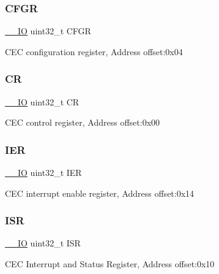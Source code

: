 \subsubsection{\texorpdfstring{C\+F\+GR}{CFGR}}
{\footnotesize\ttfamily \hyperlink{core__sc300_8h_aec43007d9998a0a0e01faede4133d6be}{\+\_\+\+\_\+\+IO} uint32\+\_\+t C\+F\+GR}

C\+EC configuration register, Address offset\+:0x04 \mbox{\label{struct_c_e_c___type_def_ab40c89c59391aaa9d9a8ec011dd0907a}} 
\subsubsection{\texorpdfstring{CR}{CR}}
{\footnotesize\ttfamily \hyperlink{core__sc300_8h_aec43007d9998a0a0e01faede4133d6be}{\+\_\+\+\_\+\+IO} uint32\+\_\+t CR}

C\+EC control register, Address offset\+:0x00 \mbox{\label{struct_c_e_c___type_def_a6566f8cfbd1d8aa7e8db046aa35e77db}} 
\subsubsection{\texorpdfstring{I\+ER}{IER}}
{\footnotesize\ttfamily \hyperlink{core__sc300_8h_aec43007d9998a0a0e01faede4133d6be}{\+\_\+\+\_\+\+IO} uint32\+\_\+t I\+ER}

C\+EC interrupt enable register, Address offset\+:0x14 \mbox{\label{struct_c_e_c___type_def_ab3c49a96815fcbee63d95e1e74f20e75}} 
\subsubsection{\texorpdfstring{I\+SR}{ISR}}
{\footnotesize\ttfamily \hyperlink{core__sc300_8h_aec43007d9998a0a0e01faede4133d6be}{\+\_\+\+\_\+\+IO} uint32\+\_\+t I\+SR}

C\+EC Interrupt and Status Register, Address offset\+:0x10 \mbox{\label{struct_c_e_c___type_def_a9bf29a9104cb5569823ab892174f9c8c}} 
